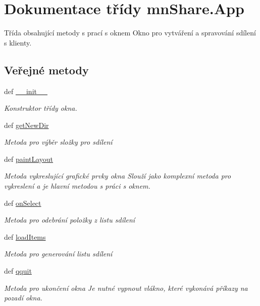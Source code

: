 \hypertarget{classmnShare_1_1App}{\section{Dokumentace třídy mn\-Share.\-App}
\label{d2/dbc/classmnShare_1_1App}
}


Třída obsahující metody s prací s oknem Okno pro vytváření a spravování sdílení s klienty.  


\subsection*{Veřejné metody}
\begin{DoxyCompactItemize}
\item 
def \hyperlink{classmnShare_1_1App_a8a3f08e5fbc6b98f5e08fcd2d7f74913}{\-\_\-\-\_\-init\-\_\-\-\_\-}
\begin{DoxyCompactList}\small\item\em Konstruktor třídy okna. \end{DoxyCompactList}\item 
def \hyperlink{classmnShare_1_1App_ac1958ea756748fdbd44363673614b37c}{get\-New\-Dir}
\begin{DoxyCompactList}\small\item\em Metoda pro výběr složky pro sdílení \end{DoxyCompactList}\item 
def \hyperlink{classmnShare_1_1App_aeb1f2e18b7a0783f9fde0b6b9ccaae3c}{paint\-Layout}
\begin{DoxyCompactList}\small\item\em Metoda vykreslující grafické prvky okna Slouží jako komplexní metoda pro vykreslení a je hlavní metodou s práci s oknem. \end{DoxyCompactList}\item 
def \hyperlink{classmnShare_1_1App_a4d800e5f9e777ffe872dbdb183d39a12}{on\-Select}
\begin{DoxyCompactList}\small\item\em Metoda pro odebrání položky z listu sdílení \end{DoxyCompactList}\item 
def \hyperlink{classmnShare_1_1App_a2e4966961e52e62198c1abd07d0a1098}{load\-Items}
\begin{DoxyCompactList}\small\item\em Metoda pro generování listu sdílení \end{DoxyCompactList}\item 
def \hyperlink{classmnShare_1_1App_a4360417a60858379494bdcfb1702b8e4}{qquit}
\begin{DoxyCompactList}\small\item\em Metoda pro ukončení okna Je nutné vypnout vlákno, které vykonává příkazy na pozadí okna. \end{DoxyCompactList}\end{DoxyCompactItemize}
